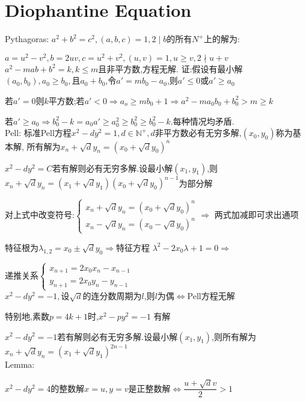 \section{Diophantine Equation} 
Pythagoras: $ a^2+b^2=c^2,(a,b,c)=1,2\mid b$的所有$ N^{+}$上的解为:

$ a=u^2-v^2,b=2uv,c=u^2+v^2,(u,v)=1,u\ge v,2 \nmid u+v$
\\

$ a^2-mab+b^2=k,k\le m$且非平方数,方程无解.
证:假设有最小解$ (a_0,b_0),a_0\ge b_0,$且$ a_0+b_0$,令$ a'=mb_0-a_0$,则$ a'\le 0$或$ a' \ge a_0$

若$ a'=0$则$ k$平方数;若$ a'<0\Rightarrow a_o\ge mb_0+1\Rightarrow a^2-ma_0b_0+b_0^2>m\ge k$

若$ a'\ge a_0\Rightarrow b_0^2-k=a_0a'\ge a_0^2\ge b_0^2\ge b_0^2-k$.每种情况均矛盾.
\\

Pell:
标准Pell方程$ x^2-dy^2=1,d\in \mathbb{N^{+}},d$非平方数必有无穷多解,$ (x_0,y_0)$称为基本解,
所有解为$ x_n+\sqrt{d}y_n=(x_0+\sqrt{d}y_0)^n$

$ x^2-dy^2=C$若有解则必有无穷多解.设最小解$ (x_1,y_1)$,则$ x_n+\sqrt{d}y_n=(x_1+\sqrt{d}y_1)(x_0+\sqrt{d}y_0)^{n-1}$为部分解

对上式中改变符号:$
\begin{cases}
x_n+\sqrt{d}y_n=(x_0+\sqrt{d}y_0)^n \\
x_n-\sqrt{d}y_n=(x_0-\sqrt{d}y_0)^n   
\end{cases}  \Rightarrow	$
两式加减即可求出通项

特征根为$ \lambda_{1,2}=x_0\pm\sqrt{d}y_0\Rightarrow $特征方程
$ \lambda^2-2x_0\lambda+1=0\Rightarrow$ 

递推关系$ \begin{cases} x_{n+1}=2x_0x_n-x_{n-1}\\ y_{n+1}=2x_0y_n-y_{n-1}\end{cases}$
\\

$ x^2-dy^2=-1,$设$ \sqrt{d}$的连分数周期为$ l$,则$ l$为偶$ \Leftrightarrow $Pell方程无解

特别地,素数$ p=4k+1$时,$ x^2-py^2=-1$	有解

$ x^2-dy^2=-1$若有解则必有无穷多解.设最小解$ (x_1,y_1)$,则所有解为$ x_n+\sqrt{d}y_n=(x_1+\sqrt{d}y_1)^{2n-1}$
\\

Lemma:

$ x^2-dy^2=4$的整数解$ x=u,y=v$是正整数解$ \Leftrightarrow \dfrac{u+\sqrt{d}v}{2}>1$

